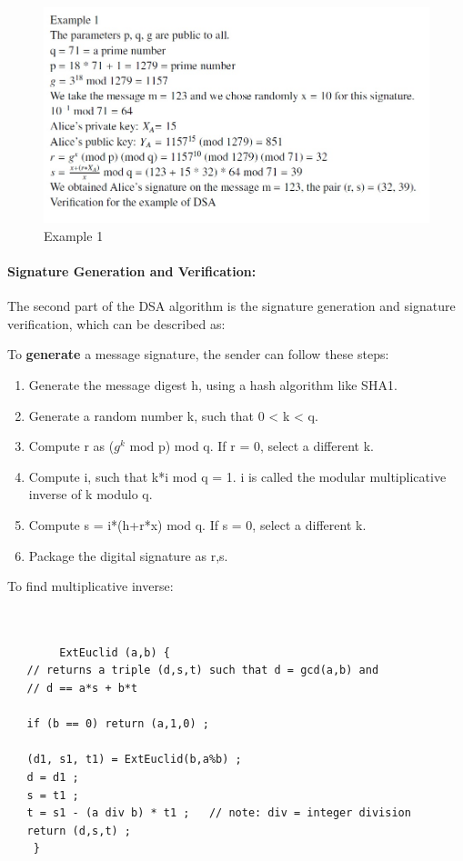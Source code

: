 \documentclass[a4paper,12pt]{article}
\newenvironment{codeblock}{\fontfamily{pcr}\selectfont}{\par}
\begin{document}
     \begin{figure}
     	\includegraphics[width=\textwidth]{dsa}
     	\caption{Example 1}
     \end{figure}
    
    
    \paragraph{Signature Generation and Verification:} The second part of the DSA algorithm is the signature generation and signature verification, which can be described as:

To \textbf{generate} a message signature, the sender can follow these steps: 
	\begin{codeblock}
	\begin{enumerate}
    	\item Generate the message digest h, using a hash algorithm like SHA1.
    	\item Generate a random number k, such that 0 < k < q.
    	\item Compute r as ($g^{k}$ mod p) mod q. If r = 0, select a different k.
    	\item Compute i, such that k*i mod q = 1. i is called the modular multiplicative inverse of k modulo q.
    	\item Compute s = i*(h+r*x) mod q. If s = 0, select a different k.
    	\item Package the digital signature as {r,s}.
	\end{enumerate}
    \end{codeblock}
    
    
To find multiplicative inverse: 
	\begin{codeblock}
	\begin{verbatim}
	    
	
    	ExtEuclid (a,b) {
   // returns a triple (d,s,t) such that d = gcd(a,b) and
   // d == a*s + b*t

   if (b == 0) return (a,1,0) ;
   
   (d1, s1, t1) = ExtEuclid(b,a%b) ;
   d = d1 ;
   s = t1 ;
   t = s1 - (a div b) * t1 ;   // note: div = integer division
   return (d,s,t) ;
    }
    \end{verbatim}
    \end{codeblock}
    
\end{document}
